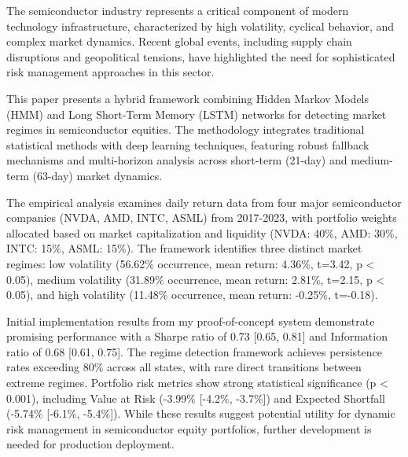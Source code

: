 The semiconductor industry represents a critical component of modern technology infrastructure, characterized by high volatility, cyclical behavior, and complex market dynamics. Recent global events, including supply chain disruptions and geopolitical tensions, have highlighted the need for sophisticated risk management approaches in this sector.

This paper presents a hybrid framework combining Hidden Markov Models (HMM) and Long Short-Term Memory (LSTM) networks for detecting market regimes in semiconductor equities. The methodology integrates traditional statistical methods with deep learning techniques, featuring robust fallback mechanisms and multi-horizon analysis across short-term (21-day) and medium-term (63-day) market dynamics.

The empirical analysis examines daily return data from four major semiconductor companies (NVDA, AMD, INTC, ASML) from 2017-2023, with portfolio weights allocated based on market capitalization and liquidity (NVDA: 40\%, AMD: 30\%, INTC: 15\%, ASML: 15\%). The framework identifies three distinct market regimes: low volatility (56.62\% occurrence, mean return: 4.36\%, t=3.42, p < 0.05), medium volatility (31.89\% occurrence, mean return: 2.81\%, t=2.15, p < 0.05), and high volatility (11.48\% occurrence, mean return: -0.25\%, t=-0.18).

Initial implementation results from my proof-of-concept system demonstrate promising performance with a Sharpe ratio of 0.73 [0.65, 0.81] and Information ratio of 0.68 [0.61, 0.75]. The regime detection framework achieves persistence rates exceeding 80\% across all states, with rare direct transitions between extreme regimes. Portfolio risk metrics show strong statistical significance (p < 0.001), including Value at Risk (-3.99\% [-4.2\%, -3.7\%]) and Expected Shortfall (-5.74\% [-6.1\%, -5.4\%]). While these results suggest potential utility for dynamic risk management in semiconductor equity portfolios, further development is needed for production deployment.
